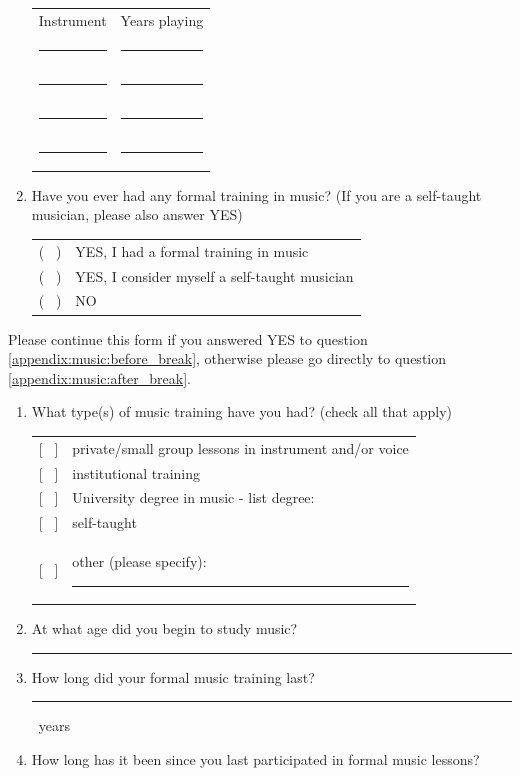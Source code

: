 \documentclass[a4paper,11pt]{article}
\newcommand{\myunderline}{\rule{2in}{.5pt}}
\begin{document}
\begin{appendices}
\begin{enumerate}[resume]
	\begin{tabular}{c c}
		Instrument &  Years playing \\
		\myunderline & \myunderline \\
		\myunderline & \myunderline \\
		\myunderline & \myunderline \\
		\myunderline & \myunderline \\
	\end{tabular}
	
	\item \label{appendix:music:before_break}Have you ever had any formal training in music? (If you are a self-taught musician, please also answer YES)

	\begin{tabular}{l l}
		( \ ) & YES, I had a formal training in music \\
		( \ ) & YES, I consider myself a self-taught musician \\
		( \ ) & NO \\
	\end{tabular}

\end{enumerate}
Please continue this form if you answered YES to question \ref{appendix:music:before_break}, otherwise please go directly to question \ref{appendix:music:after_break}.
\begin{enumerate}[resume]

	\item What type(s) of music training have you had? (check all that apply)

	\begin{tabular}{l l}
		{[{ \ }]} & private/small group lessons in instrument and/or voice \\
		{[{ \ }]} & institutional training \\
		{[{ \ }]} & University degree in music - list degree: \\
		{[{ \ }]} & self-taught \\
		{[{ \ }]} & other (please specify): \myunderline \\
	\end{tabular}

 	\item At what age did you begin to study music?

 	\myunderline

 	\item How long did your formal music training last?

 	\myunderline \ years
 	\item How long has it been since you last participated in formal music lessons?


\end{enumerate}
\end{appendices}
\end{document}

